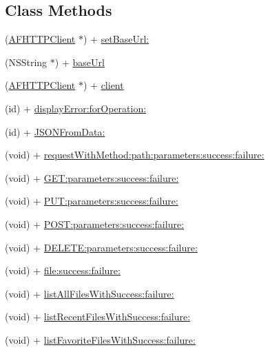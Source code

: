 \subsection*{Class Methods}
\begin{DoxyCompactItemize}
\item 
(\hyperlink{interface_a_f_h_t_t_p_client}{A\-F\-H\-T\-T\-P\-Client} $\ast$) + \hyperlink{interface_w_request_aee347f58a67e9e4bf008f123670a9ac9}{set\-Base\-Url\-:}
\item 
(N\-S\-String $\ast$) + \hyperlink{interface_w_request_ae0a298f1d33bd7fce962c72ee86516aa}{base\-Url}
\item 
(\hyperlink{interface_a_f_h_t_t_p_client}{A\-F\-H\-T\-T\-P\-Client} $\ast$) + \hyperlink{interface_w_request_aeb64be717a74de162b4504b3fcd2ec54}{client}
\item 
(id) + \hyperlink{interface_w_request_a9357742571c1ca423c27d4ceef2ef0e4}{display\-Error\-:for\-Operation\-:}
\item 
(id) + \hyperlink{interface_w_request_ab46d7c29a0c52a7d305c0965eb6d82ea}{J\-S\-O\-N\-From\-Data\-:}
\item 
(void) + \hyperlink{interface_w_request_a7f42838addd665ab76b52e245039d812}{request\-With\-Method\-:path\-:parameters\-:success\-:failure\-:}
\item 
(void) + \hyperlink{interface_w_request_a1ef2852feb31fbaf3597530dd54bd6f6}{G\-E\-T\-:parameters\-:success\-:failure\-:}
\item 
(void) + \hyperlink{interface_w_request_ada215e2e04baf0486b7e8032f3d9e4c2}{P\-U\-T\-:parameters\-:success\-:failure\-:}
\item 
(void) + \hyperlink{interface_w_request_a17144a2f1f9ba4b2e763a2a0b936073b}{P\-O\-S\-T\-:parameters\-:success\-:failure\-:}
\item 
(void) + \hyperlink{interface_w_request_ab18ea4c1da35482f40c88fcd054d770e}{D\-E\-L\-E\-T\-E\-:parameters\-:success\-:failure\-:}
\item 
(void) + \hyperlink{interface_w_request_abf7ddcdde072e3541a959734263216e1}{file\-:success\-:failure\-:}
\item 
(void) + \hyperlink{interface_w_request_a29ccd44a4227f89aaa66964a7dc50fd0}{list\-All\-Files\-With\-Success\-:failure\-:}
\item 
(void) + \hyperlink{interface_w_request_a0cec426a8bb229f07a6693095c423cf3}{list\-Recent\-Files\-With\-Success\-:failure\-:}
\item 
(void) + \hyperlink{interface_w_request_a8d48f16b2bd30e95c65add873ac983f9}{list\-Favorite\-Files\-With\-Success\-:failure\-:}

\end{DoxyCompactItemize}
